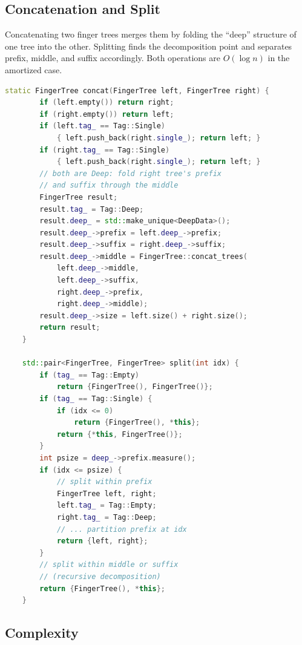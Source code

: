\subsection{Concatenation and Split}

Concatenating two finger trees merges them by folding the ``deep'' structure of one tree into the other. Splitting finds the decomposition point and separates prefix, middle, and suffix accordingly. Both operations are $O(\log n)$ in the amortized case.

\begin{lstlisting}[language=C++]
    static FingerTree concat(FingerTree left, FingerTree right) {
        if (left.empty()) return right;
        if (right.empty()) return left;
        if (left.tag_ == Tag::Single)
            { left.push_back(right.single_); return left; }
        if (right.tag_ == Tag::Single)
            { left.push_back(right.single_); return left; }
        // both are Deep: fold right tree's prefix
        // and suffix through the middle
        FingerTree result;
        result.tag_ = Tag::Deep;
        result.deep_ = std::make_unique<DeepData>();
        result.deep_->prefix = left.deep_->prefix;
        result.deep_->suffix = right.deep_->suffix;
        result.deep_->middle = FingerTree::concat_trees(
            left.deep_->middle,
            left.deep_->suffix,
            right.deep_->prefix,
            right.deep_->middle);
        result.deep_->size = left.size() + right.size();
        return result;
    }

    std::pair<FingerTree, FingerTree> split(int idx) {
        if (tag_ == Tag::Empty)
            return {FingerTree(), FingerTree()};
        if (tag_ == Tag::Single) {
            if (idx <= 0)
                return {FingerTree(), *this};
            return {*this, FingerTree()};
        }
        int psize = deep_->prefix.measure();
        if (idx <= psize) {
            // split within prefix
            FingerTree left, right;
            left.tag_ = Tag::Empty;
            right.tag_ = Tag::Deep;
            // ... partition prefix at idx
            return {left, right};
        }
        // split within middle or suffix
        // (recursive decomposition)
        return {FingerTree(), *this};
    }
\end{lstlisting}

\subsection{Complexity}


